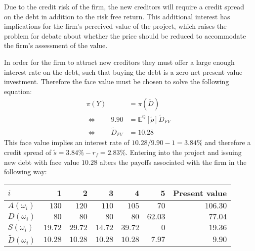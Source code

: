 \documentclass[../main.tex]{subfiles}
\begin{document}
        Due to the credit risk of the firm, the new creditors will require a credit spread on the debt in addition to the risk free return.
        This additional interest has implications for the firm's perceived value of the project, which raises the problem for debate about whether the price should be reduced to accommodate the firm's assessment of the value.

        In order for the firm to attract new creditors they must offer a large enough interest rate on the debt, such that buying the debt is a zero net present value investment.
        Therefore the face value must be chosen to solve the following equation:
            \begin{align}
                \pi(Y) &= \pi(\tilde{D}) \\
                \Leftrightarrow  \qquad
                9.90 &= \mathbb{E}^{\mathbb{Q}}\left[\tilde{\rho}\right] \tilde{D}_{FV} \\
                \Leftrightarrow  \qquad
                \tilde{D}_{FV} &= 10.28
            \end{align}
        This face value implies an interest rate of $10.28 / 9.90 - 1 = 3.84\%$
        and therefore a credit spread of $\tilde{s} = 3.84\% - r_{f} = 2.83\%$.
        Entering into the project and issuing new debt with face value $10.28$ alters the payoffs associated with the firm in the following way:
        \begin{table}[H]
            \centering
            \begin{tabular}{l|rrrrr||r}
                $i$ & 1 & 2 & 3 & 4 & 5 & Present value \\
                \hline
                $A(\omega_{i})$ & $130$ & $120$ & $110$ & $105$ & $70$ & $106.30$ \\
                $D(\omega_{i})$ & $80$ & $80$ & $80$ & $80$ & $62.03$ & $77.04$ \\
                $S(\omega_{i})$ & $19.72$ & $29.72$ & $14.72$ & $39.72$ & $0$ & $19.36$ \\
                $\tilde{D}(\omega_{i})$ & $10.28$ & $10.28$ & $10.28$ & $10.28$ & $7.97$ & $9.90$ \\
            \end{tabular}
        \end{table}
\end{document}

